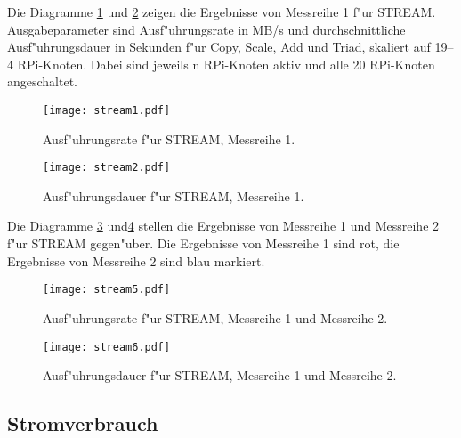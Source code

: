 Die Diagramme \ref{fig:stream1} und \ref{fig:stream2} zeigen die Ergebnisse von Messreihe 1 f"ur STREAM. Ausgabeparameter sind Ausf"uhrungsrate in MB/s und durchschnittliche Ausf"uhrungsdauer in Sekunden f"ur Copy, Scale, Add und Triad, skaliert auf 19--4 RPi-Knoten. Dabei sind jeweils n RPi-Knoten aktiv und alle 20 RPi-Knoten angeschaltet.  
\begin{figure}[htb]
  \centering
  \texttt{[image: stream1.pdf]}\\ 
  \caption{Ausf"uhrungsrate f"ur STREAM, Messreihe 1.}
  \label{fig:stream1}		
\end{figure}
\begin{figure}[htb]
  \centering
  \texttt{[image: stream2.pdf]}\\ 
  \caption{Ausf"uhrungsdauer f"ur STREAM, Messreihe 1.}
  \label{fig:stream2}		
\end{figure}
\noindent
Die Diagramme \ref{fig:stream5} und\ref{fig:stream6} stellen die Ergebnisse von Messreihe 1 und Messreihe 2 f"ur STREAM gegen"uber. Die Ergebnisse von Messreihe 1 sind rot, die Ergebnisse von Messreihe 2 sind blau markiert. 
\begin{figure}[htb]
  \centering
  \texttt{[image: stream5.pdf]}\\ 
  \caption{Ausf"uhrungsrate f"ur STREAM, Messreihe 1 und Messreihe 2.}\label{fig:stream5}
\end{figure}
\begin{figure}[htb]
  \centering
  \texttt{[image: stream6.pdf]}\\ 
  \caption{Ausf"uhrungsdauer f"ur STREAM, Messreihe 1 und Messreihe 2.}\label{fig:stream6}
\end{figure}

\subsection{Stromverbrauch}\label{Ergebnisse-Energenie}

